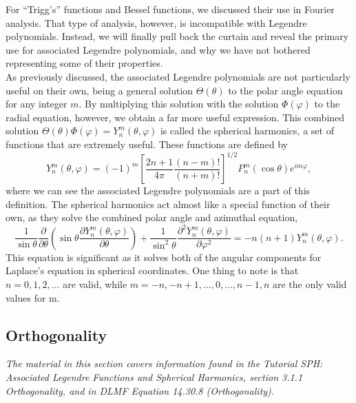 \documentclass[11pt]{report}
\newcommand{\fdel}[2]{\dfrac{\partial{#1}}{\partial {#2}}} %
\newcommand{\sdel}[2]{\dfrac{\partial^2{#1}}{\partial{#2}^2}} %
\newcommand{\fpar}[1]{\left({#1}\right)}
\newcommand{\fbrac}[1]{\left[{#1}\right]}
\begin{document}

For ``Trigg's'' functions and Bessel functions, we discussed their use in Fourier analysis. That type of analysis, however, is incompatible with Legendre polynomials. Instead, we will finally pull back the curtain and reveal the primary use for associated Legendre polynomials, and why we have not bothered representing some of their properties.\\

As previously discussed, the associated Legendre polynomials are not particularly useful on their own, being a general solution $\Theta(\theta)$ to the polar angle equation for any integer $m$. By multiplying this solution with the solution $\Phi(\varphi)$ to the radial equation, however, we obtain a far more useful expression. This combined solution $\Theta(\theta)\Phi(\varphi) = Y_n^m\fpar{\theta,\varphi}$ is called the spherical harmonics, a set of functions that are extremely useful. These functions are defined by
    \begin{equation}
        Y_n^m\fpar{\theta,\varphi}= \fpar{-1}^m\fbrac{\frac{2n+1}{4\pi}\frac{\fpar{n-m}!}{\fpar{n+m}!}}^{1/2}P_n^m\fpar{\cos\theta}e^{im\varphi},
    \end{equation}
where we can see the associated Legendre polynomials are a part of this definition. The spherical harmonics act almost like a special function of their own, as they solve the combined polar angle and azimuthal equation,
    \begin{equation}
        \frac{1}{\sin\theta}\fdel{}{\theta}\fpar{\sin\theta\fdel{Y^m_n\fpar{\theta,\varphi}}{\theta}}+\frac{1}{\sin^2\theta}\sdel{Y^m_n\fpar{\theta,\varphi}}{\varphi}=-n(n+1)Y^m_n\fpar{\theta,\varphi}.
    \end{equation}
This equation is significant as it solves both of the angular components for Laplace's equation in spherical coordinates. One thing to note is that $n=0,1,2,...$ are valid, while $m=-n,-n+1,...,0,...,n-1,n$ are the only valid values for m.

\subsection{Orthogonality}

\emph{The material in this section covers information found in the Tutorial SPH: Associated Legendre Functions and Spherical Harmonics, section 3.1.1 Orthogonality, and in DLMF Equation 14.30.8 (Orthogonality).}\\
\end{document}
